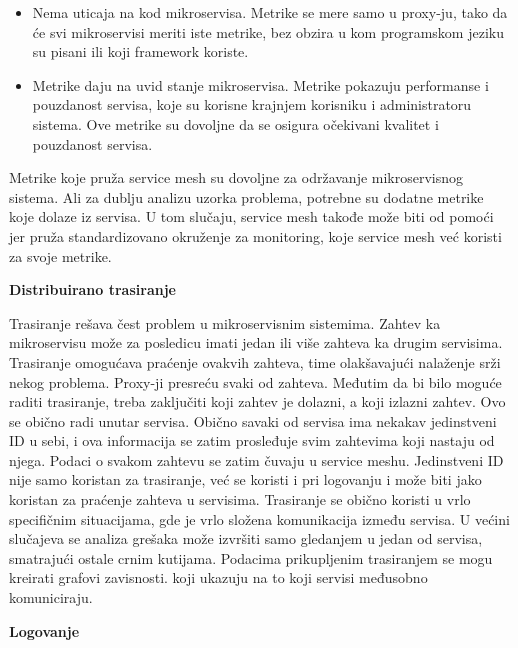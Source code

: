 \documentclass[a4paper,12pt]{report}
\begin{document}
\begin{itemize}
	\item Nema uticaja na kod mikroservisa. Metrike se mere samo u proxy-ju, tako da će svi mikroservisi meriti iste metrike, bez obzira u kom programskom jeziku su pisani ili koji framework koriste.
	\item Metrike daju na uvid stanje mikroservisa. Metrike pokazuju performanse i pouzdanost servisa, koje su korisne krajnjem korisniku i administratoru sistema. Ove metrike su dovoljne da se osigura očekivani kvalitet i pouzdanost servisa. 
\end{itemize}

Metrike koje pruža service mesh su dovoljne za održavanje mikroservisnog sistema. Ali za dublju analizu uzorka problema, potrebne su dodatne metrike koje dolaze iz servisa. U tom slučaju, service mesh takođe može biti od pomoći jer pruža standardizovano okruženje za monitoring, koje service mesh već koristi za svoje metrike. \newline

\textbf{Distribuirano trasiranje}\newline

Trasiranje rešava čest problem u mikroservisnim sistemima. Zahtev ka mikroservisu može za posledicu imati jedan ili više zahteva ka drugim servisima. Trasiranje omogućava praćenje ovakvih zahteva, time olakšavajući nalaženje srži nekog problema. Proxy-ji presreću svaki od zahteva. Međutim da bi bilo moguće raditi trasiranje, treba zaključiti koji zahtev je dolazni, a koji izlazni zahtev. Ovo se obično radi unutar servisa. Obično savaki od servisa ima nekakav jedinstveni ID u sebi, i ova informacija se zatim prosleđuje svim zahtevima koji nastaju od njega. Podaci o svakom zahtevu se  zatim čuvaju u service meshu. Jedinstveni ID nije samo koristan za trasiranje, već se koristi i pri logovanju i može biti jako koristan za praćenje zahteva u servisima. Trasiranje se obično koristi u vrlo specifičnim situacijama, gde je vrlo složena komunikacija između servisa. U većini slučajeva se analiza grešaka može izvršiti samo gledanjem u jedan od servisa, smatrajući ostale crnim kutijama. Podacima prikupljenim trasiranjem se mogu kreirati grafovi zavisnosti. koji ukazuju na to koji servisi međusobno komuniciraju. \newline

\textbf{Logovanje}\newline
\end{document}
